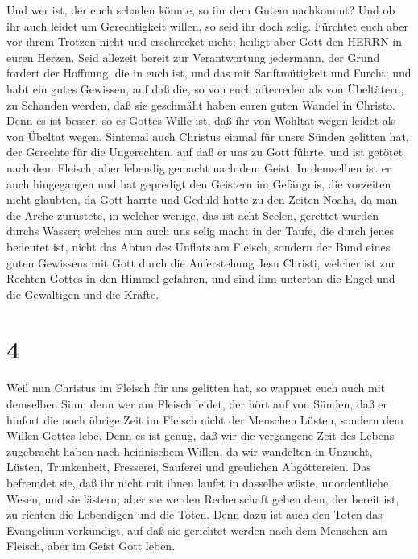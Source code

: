  Und wer ist, der euch schaden könnte, so ihr dem Gutem
nachkommt?  Und ob ihr auch leidet um Gerechtigkeit willen,
so seid ihr doch selig. Fürchtet euch aber vor ihrem Trotzen nicht und
erschrecket nicht;  heiligt aber Gott den HERRN in euren
Herzen. Seid allezeit bereit zur Verantwortung jedermann, der Grund
fordert der Hoffnung, die in euch ist,  und das mit
Sanftmütigkeit und Furcht; und habt ein gutes Gewissen, auf daß die, so
von euch afterreden als von Übeltätern, zu Schanden werden, daß sie
geschmäht haben euren guten Wandel in Christo.  Denn es ist
besser, so es Gottes Wille ist, daß ihr von Wohltat wegen leidet als von
Übeltat wegen.  Sintemal auch Christus einmal für unsre
Sünden gelitten hat, der Gerechte für die Ungerechten, auf daß er uns zu
Gott führte, und ist getötet nach dem Fleisch, aber lebendig gemacht
nach dem Geist.  In demselben ist er auch hingegangen und
hat gepredigt den Geistern im Gefängnis,  die vorzeiten
nicht glaubten, da Gott harrte und Geduld hatte zu den Zeiten Noahs, da
man die Arche zurüstete, in welcher wenige, das ist acht Seelen,
gerettet wurden durchs Wasser;  welches nun auch uns selig
macht in der Taufe, die durch jenes bedeutet ist, nicht das Abtun des
Unflats am Fleisch, sondern der Bund eines guten Gewissens mit Gott
durch die Auferstehung Jesu Christi,  welcher ist zur
Rechten Gottes in den Himmel gefahren, und sind ihm untertan die Engel
und die Gewaltigen und die Kräfte.

\hypertarget{section-3}{%
\section{4}\label{section-3}}

 Weil nun Christus im Fleisch für uns gelitten hat, so
wappnet euch auch mit demselben Sinn; denn wer am Fleisch leidet, der
hört auf von Sünden,  daß er hinfort die noch übrige Zeit im
Fleisch nicht der Menschen Lüsten, sondern dem Willen Gottes lebe.
 Denn es ist genug, daß wir die vergangene Zeit des Lebens
zugebracht haben nach heidnischem Willen, da wir wandelten in Unzucht,
Lüsten, Trunkenheit, Fresserei, Sauferei und greulichen Abgöttereien.
 Das befremdet sie, daß ihr nicht mit ihnen laufet in
dasselbe wüste, unordentliche Wesen, und sie lästern;  aber
sie werden Rechenschaft geben dem, der bereit ist, zu richten die
Lebendigen und die Toten.  Denn dazu ist auch den Toten das
Evangelium verkündigt, auf daß sie gerichtet werden nach dem Menschen am
Fleisch, aber im Geist Gott leben.

